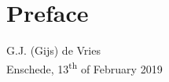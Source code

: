 \chapter*{Preface}

\vskip-10pt

\vskip10pt
G.J. (Gijs) de Vries\\
Enschede, 13\textsuperscript{th} of February 2019